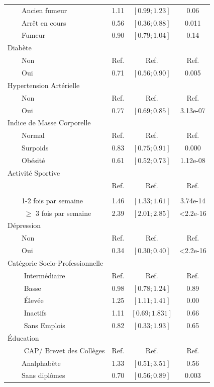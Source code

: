 \documentclass{book}
\begin{document}
\begin{longtable}{lccc}
$\qquad$Ancien fumeur&1.11&$\left[0.99 ; 1.23 \right]$ &0.06\\
$\qquad$Arrêt en cours& 0.56 & $\left[0.36 ; 0.88 \right]$&0.011\\
$\qquad$Fumeur&0.90 & $\left[0.79 ; 1.04 \right]$& 0.14\\
Diabète&&&\\
$\qquad$Non &Ref.&Ref.&Ref.\\
$\qquad$Oui & 0.71 & $\left[0.56 ; 0.90 \right]$ & 0.005\\
Hypertension Artérielle&&&\\
$\qquad$Non &Ref.&Ref.&Ref.\\
$\qquad$Oui&0.77& $\left[0.69 ; 0.85 \right]$&3.13e-07\\
Indice de Masse Corporelle &&&\\
$\qquad$Normal&Ref.&Ref.&Ref.\\
$\qquad$Surpoids&0.83&$\left[0.75 ; 0.91 \right]$ &0.000\\
$\qquad$Obésité&0.61&$\left[0.52 ; 0.73 \right]$&1.12e-08\\
Activité Sportive&&&\\
$\qquad$&Ref.&Ref.&Ref.\\\\
$\qquad$1-2 fois par semaine&1.46& $\left[1.33 ; 1.61 \right]$& 3.74e-14\\
$\qquad$ $\geq$ 3 fois par semaine&2.39& $\left[2.01 ; 2.85 \right]$ & <2.2e-16\\
Dépression&&&\\
$\qquad$Non & Ref. & Ref. & Ref.\\
$\qquad$Oui & 0.34 & $\left[0.30 ; 0.40\right]$ & <2.2e-16\\
Catégorie Socio-Professionnelle&&&\\
$\qquad$ Intermédiaire & Ref. & Ref. & Ref.\\
$\qquad$ Basse & 0.98 & $\left[0.78 ; 1.24 \right]$ &0.89\\
$\qquad$ Élevée & 1.25 & $\left[1.11 ; 1.41 \right]$ &0.00\\
$\qquad$ Inactifs &1.11 &   $\left[0.69 ; 1.831 \right]$ & 0.66\\
$\qquad$ Sans Emplois &0.82 &  $\left[0.33 ; 1.93 \right]$&0.65 \\ 
Éducation&&&\\
$\qquad$ CAP/ Brevet des Collèges &Ref.&Ref.&Ref.\\
$\qquad$Analphabète&1.33&$\left[0.51 ; 3.51 \right]$&0.56\\
$\qquad$Sans diplômes&0.70& $\left[0.56 ; 0.89 \right]$&0.003\\

\end{longtable}
\end{document}
